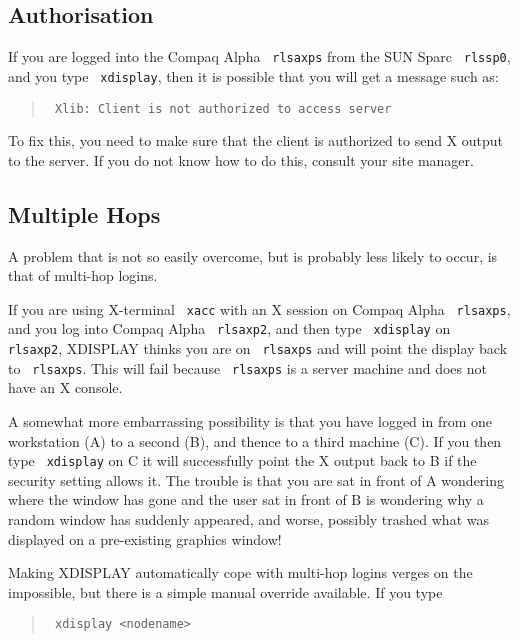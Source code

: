 \documentclass[twoside,11pt]{article}
\newcommand{\xlabel}[1]{}
\renewcommand{\_}{\texttt{\symbol{95}}}
\begin{document}
\subsection{\label{security}\xlabel{security}Authorisation}

If you are logged into the Compaq Alpha \texttt{ rlsaxps} from the
SUN Sparc \texttt{ rlssp0}, and you type \texttt{ xdisplay}, then it is possible
that you will get a message such as:

\begin{quote}\texttt{
Xlib:  Client is not authorized to access server
}
\end{quote}

To fix this, you need to make sure that the client is authorized to send X
output to the server.  If you do not know how to do this, consult your site
manager.

\subsection{\label{multihop}\xlabel{multihop}Multiple Hops}

A problem that is not so easily overcome, but is probably less likely
to occur, is that of multi-hop logins.

If you are using X-terminal \texttt{ xacc} with an X session on Compaq Alpha
\texttt{ rlsaxps},  and you log into Compaq Alpha \texttt{ rlsaxp2}, and then type
\texttt{ xdisplay} on \texttt{ rlsaxp2}, XDISPLAY thinks you are on \texttt{ rlsaxps}
and will point the display back to \texttt{ rlsaxps}.  This will fail because 
\texttt{ rlsaxps} is a server machine and does not have an X console.  

A somewhat more embarrassing possibility is that you have logged in from
 one workstation (A) to a second (B), and thence to a third machine
(C). If you then type \texttt{ xdisplay} on C it will successfully point
the X output back to B if the security setting allows it. The trouble
is that you are sat in front of A wondering where the window has gone
and the user sat in front of B is wondering why a random window has
suddenly appeared, and worse, possibly trashed what was displayed on
a pre-existing graphics window! 

Making XDISPLAY automatically cope with multi-hop logins verges on the
impossible, but there is a simple manual override available. If you
type

\begin{quote}\texttt{
xdisplay <nodename>
}
\end{quote}
\end{document}
